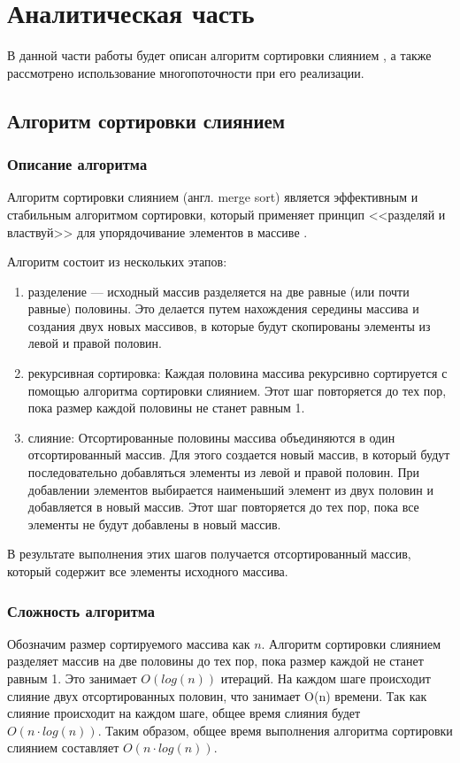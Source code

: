 \chapter{Аналитическая часть}
В данной части работы будет описан  алгоритм сортировки слиянием , 
а также рассмотрено использование многопоточности при его реализации.

\section{Алгоритм сортировки слиянием}


\subsection{Описание алгоритма}
Алгоритм сортировки слиянием (англ. merge sort) является эффективным и стабильным алгоритмом сортировки, который применяет принцип <<разделяй и властвуй>> для упорядочивание элементов в массиве \cite{merge-sort}.

Алгоритм состоит из нескольких этапов:
\begin{enumerate}
	\item разделение ---  исходный массив разделяется на две равные (или почти равные) половины. Это делается путем нахождения середины массива и создания двух новых массивов, в которые будут скопированы элементы из левой и правой половин.
	
	\item рекурсивная сортировка: Каждая половина массива рекурсивно сортируется с помощью алгоритма сортировки слиянием. Этот шаг повторяется до тех пор, пока размер каждой половины не станет равным 1.

	\item слияние: Отсортированные половины массива объединяются в один отсортированный массив. Для этого создается новый массив, в который будут последовательно добавляться элементы из левой и правой половин. При добавлении элементов выбирается наименьший элемент из двух половин и добавляется в новый массив. Этот шаг повторяется до тех пор, пока все элементы не будут добавлены в новый массив.
\end{enumerate}
В результате выполнения этих шагов получается отсортированный массив, который содержит все элементы исходного массива.

\subsection{Сложность алгоритма}
Обозначим размер сортируемого массива как $n$. 
Алгоритм сортировки слиянием разделяет массив на две половины до тех пор, пока размер каждой  не станет равным 1. Это занимает $O(log(n))$ итераций.
На каждом шаге происходит слияние двух отсортированных половин, что занимает O(n) времени. Так как слияние происходит на каждом шаге, общее время слияния будет $O(n \cdot log(n))$.
Таким образом, общее время выполнения алгоритма сортировки слиянием составляет $O(n  \cdot log(n))$.


